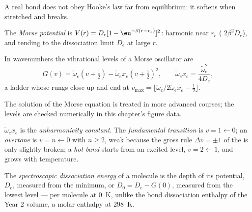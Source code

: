 A real bond does not obey Hooke's law far from equilibrium: it softens when
stretched and breaks.

\begin{definition}\label{def:b3:rovibrational-spectroscopy:morse}
The \emph{Morse potential} is $V(r) = D_e[1 -
\eu^{-\beta(r - r_e)}]^2$: harmonic near $r_e$ ( $2\beta^2D_e$), and
tending to the dissociation limit $D_e$ at large $r$.
\end{definition}

\begin{proposition}\label{prop:b3:rovibrational-spectroscopy:morse-levels}
In wavenumbers the vibrational levels of a Morse oscillator are
\[
G(v) = \tilde\omega_e(v + \tfrac12) - \tilde\omega_ex_e(v + \tfrac12)^2, \qquad
\tilde\omega_ex_e = \frac{\tilde\omega_e^2}{4D_e},
\]
a ladder whose rungs close up and end at $v_{\max} = \lfloor\tilde\omega_e/
2\tilde\omega_ex_e - \frac12\rfloor$.
\end{proposition}
\admitted

The solution of the Morse equation is treated in more advanced courses;
the levels are checked numerically in this chapter's figure data.

\begin{definition}\label{def:b3:rovibrational-spectroscopy:anharmonic}
$\tilde\omega_ex_e$ is the \emph{anharmonicity constant}.
The \emph{fundamental transition}
is $v = 1 \leftarrow 0$; an \emph{overtone} is $v = n \leftarrow 0$
with $n \ge 2$, weak because the gross rule $\Delta v = \pm1$ of the  is only slightly broken; a \emph{hot band} starts
from an excited level, $v = 2 \leftarrow 1$, and grows with temperature.
\end{definition}

\begin{definition}\label{def:b3:rovibrational-spectroscopy:dissociation}
The \emph{spectroscopic dissociation energy}
of a molecule is the depth of its potential, $D_e$, measured from the
minimum, or $D_0 = D_e - G(0)$, measured from the lowest level --- per
molecule at \qty{0}{K}, unlike the bond dissociation enthalpy of the Year 2
volume, a molar enthalpy at \qty{298}{K}.
\end{definition}

